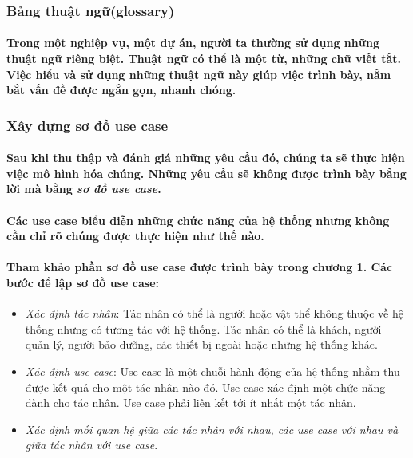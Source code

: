\documentclass{article}
\begin{document}
    \subsubsection{Bảng thuật ngữ(glossary)}
      \paragraph{\textnormal{
        Trong một nghiệp vụ, một dự án, người ta thường sử dụng những thuật ngữ riêng biệt. Thuật ngữ có thể là một từ, những chữ viết tắt. Việc hiểu và sử dụng những thuật ngữ này giúp việc trình bày, nắm bắt vấn đề được ngắn gọn, nhanh chóng.
      }}
    
    \subsubsection{Xây dựng sơ đồ use case}
      \paragraph{\textnormal{
        Sau khi thu thập và đánh giá những yêu cầu đó, chúng ta sẽ thực hiện việc mô hình hóa chúng. Những yêu cầu sẽ không được trình bày bằng lời mà bằng \textit{sơ đồ use case}.
      }}
      \paragraph{\textnormal{
        Các use case biểu diễn những chức năng của hệ thống nhưng không cần chỉ rõ chúng được thực hiện như thế nào.
      }}
      \paragraph{\textnormal{
        Tham khảo phần sơ đồ use case được trình bày trong chương 1. Các bước để lập sơ đồ use case:
      }}
      \begin{itemize}
        \item \textit{Xác định tác nhân}: Tác nhân có thể là người hoặc vật thể không thuộc về hệ thống nhưng có tương tác với hệ thống. Tác nhân có thể là khách, người quản lý, người bảo dưỡng, các thiết bị ngoài hoặc những hệ thống khác.
        \item \textit{Xác định use case}: Use case là một chuỗi hành động của hệ thống nhằm thu được kết quả cho một tác nhân nào đó. Use case xác định một chức năng dành cho tác nhân. Use case phải liên kết tới ít nhất một tác nhân.
        \item \textit{Xác định mối quan hệ giữa các tác nhân với nhau, các use case với nhau và giữa tác nhân với use case}.
      \end{itemize}
    
\end{document}
